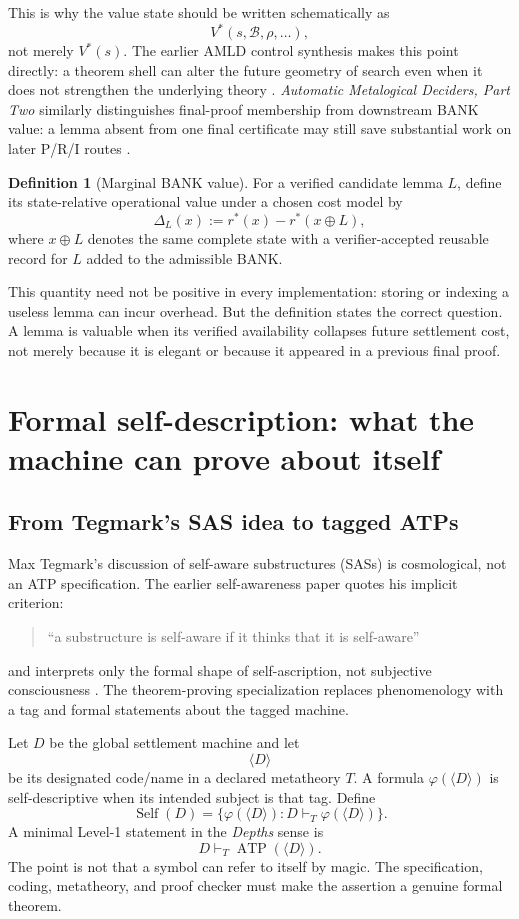 \documentclass[11pt]{article}
\theoremstyle{definition}
\newtheorem{definition}[theorem]{Definition}
\theoremstyle{remark}
\newcommand{\Bank}{\mathcal B}
\newcommand{\Self}{\operatorname{Self}}
\newcommand{\ATP}{\operatorname{ATP}}
\begin{document}
This is why the value state should be written schematically as
\[
V^*(s,\Bank,\rho,\ldots),
\]
not merely $V^*(s)$. The earlier AMLD control synthesis makes this point directly: a theorem shell can alter the future geometry of search even when it does not strengthen the underlying theory \cite{CompassControl}. \emph{Automatic Metalogical Deciders, Part Two} similarly distinguishes final-proof membership from downstream BANK value: a lemma absent from one final certificate may still save substantial work on later P/R/I routes \cite{AMLD2}.

\begin{definition}[Marginal BANK value]
For a verified candidate lemma $L$, define its state-relative operational value under a chosen cost model by
\[
\Delta_L(x)
:=r^*(x)-r^*(x\oplus L),
\]
where $x\oplus L$ denotes the same complete state with a verifier-accepted reusable record for $L$ added to the admissible BANK.
\end{definition}

This quantity need not be positive in every implementation: storing or indexing a useless lemma can incur overhead. But the definition states the correct question. A lemma is valuable when its verified availability collapses future settlement cost, not merely because it is elegant or because it appeared in a previous final proof.

\section{Formal self-description: what the machine can prove about itself}

\subsection{From Tegmark's SAS idea to tagged ATPs}
Max Tegmark's discussion of self-aware substructures (SASs) is cosmological, not an ATP specification. The earlier self-awareness paper quotes his implicit criterion:
\begin{quote}
``a substructure is self-aware if it thinks that it is self-aware''
\end{quote}
and interprets only the formal shape of self-ascription, not subjective consciousness \cite{Tegmark,Depths}. The theorem-proving specialization replaces phenomenology with a tag and formal statements about the tagged machine.

Let $D$ be the global settlement machine and let
\[
\langle D\rangle
\]
be its designated code/name in a declared metatheory $T$. A formula $\varphi(\langle D\rangle)$ is self-descriptive when its intended subject is that tag. Define
\[
\Self(D)
=
\{\varphi(\langle D\rangle):D\vdash_T\varphi(\langle D\rangle)\}.
\]
A minimal Level-1 statement in the \emph{Depths} sense is
\[
D\vdash_T\ATP(\langle D\rangle).
\]
The point is not that a symbol can refer to itself by magic. The specification, coding, metatheory, and proof checker must make the assertion a genuine formal theorem.
\end{document}
